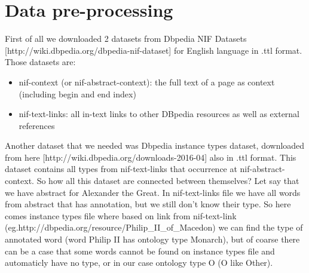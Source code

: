 \documentclass[thesis=M,english]{FITthesis}[2018/05/30]
\begin{document}
\section{Data pre-processing}\label{dataPreProcessing}
First of all we downloaded 2 datasets from Dbpedia NIF Datasets [http://wiki.dbpedia.org/dbpedia-nif-dataset] for English language in .ttl format. Those datasets are: 
\begin{itemize}
	\item nif-context (or nif-abstract-context): the full text of a page as context (including begin and end index)
	\item nif-text-links: all in-text links to other DBpedia resources as well as external references
\end{itemize}  
Another dataset that we needed was Dbpedia instance types dataset, downloaded from here [http://wiki.dbpedia.org/downloads-2016-04] also in .ttl format. This dataset contains all types from nif-text-links that occurrence at nif-abstract-context.
So how all this dataset are connected between themselves? Let say that we have abstract for Alexander the Great. In nif-text-links file we have all words from abstract that has annotation, but we still don't know their type. So here comes instance types file where based on link from nif-text-link (eg.http://dbpedia.org/resource/Philip\_II\_of\_Macedon) we can find the type of annotated word (word Philip II has ontology type Monarch), but of coarse there can be a case that some words cannot be found on instance types file and automaticly have no type, or in our case ontology type O (O like Other).
\end{document}
